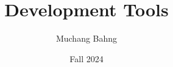 \documentclass{article}
\begin{document}
\title{Development Tools}
\author{Muchang Bahng}
\date{Fall 2024}

\maketitle
\tableofcontents
\pagebreak






 

 




\end{document}
